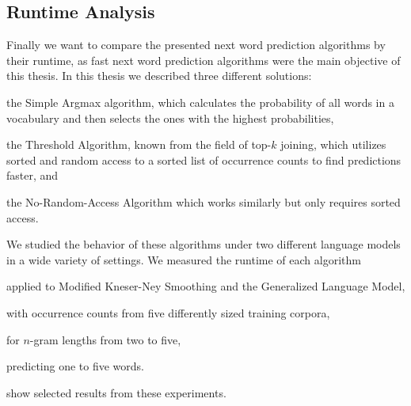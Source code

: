 \clearpage
\subsection{Runtime Analysis}
\label{subsec:evaluation-topkjoin-time}

Finally we want to compare the presented next word prediction algorithms by
their runtime, as fast next word prediction algorithms were the main objective
of this thesis.
In this thesis we described three different solutions:
\begin{inparaenum}[(1)]
  \item the Simple Argmax algorithm, which calculates the probability of all
    words in a vocabulary and then selects the ones with the highest
    probabilities,
  \item the Threshold Algorithm, known from the field of top-$k$ joining,
    which utilizes sorted and random access to a sorted list of occurrence
    counts to find predictions faster, and
  \item the No-Random-Access Algorithm which works similarly but only requires
    sorted access.
\end{inparaenum}

We studied the behavior of these algorithms under two different language models
in a wide variety of settings.
We measured the runtime of each algorithm
\begin{inparaenum}[(1)]
  \item applied to Modified Kneser-Ney Smoothing and the Generalized Language
    Model,
  \item with occurrence counts from five differently sized training corpora,
  \item for $n$-gram lengths from two to five,
  \item predicting one to five words.
\end{inparaenum}
show selected results from these experiments.

